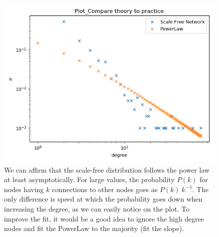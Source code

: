 \documentclass[10pt,a4paper]{article}
\begin{document}
\begin{enumerate}
\begin{figure}[H]
	\centering
	\includegraphics[width=0.7\linewidth]{"../Scripts/Plot_Compare theory to practice"}
	\caption[Theory vs Practice]{ We can affirm that the scale-free distribution follows the power law at least asymptotically. For large values, the probability $P(k)$ for nodes having $ k $ connections to other nodes goes as $P(k) ~ k^{-\lambda}$. The only difference is speed at which the probability goes down when increasing the degree, as we can easily notice on the plot. To improve the fit, it would be a good idea to ignore the high degree nodes and fit the PowerLaw to the majority (fit the slope). }
	\label{fig:compare-theory-to-practice}
\end{figure}

\end{enumerate}
\end{document}
